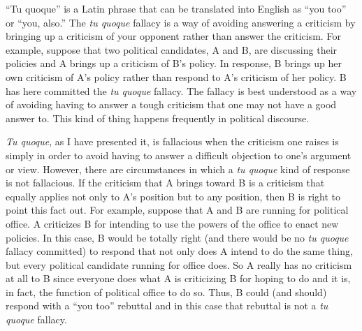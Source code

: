 ``Tu quoque'' is a Latin phrase that can be translated into English as ``you too'' or ``you, also.'' The \textit{tu quoque} fallacy is a way of avoiding answering a criticism by bringing up a criticism of your opponent rather than answer the criticism. For example, suppose that two political candidates, A and B, are discussing their policies and A brings up a criticism of B's policy. In response, B brings up her own criticism of A's policy rather than respond to A's criticism of her policy. B has here committed the \textit{tu quoque} fallacy. The fallacy is best understood as a way of avoiding having to answer a tough criticism that one may not have a good answer to. This kind of thing happens frequently in political discourse.

\textit{Tu quoque}, as I have presented it, is fallacious when the criticism one raises is simply in order to avoid having to answer a difficult objection to one's argument or view. However, there are circumstances in which a \textit{tu quoque} kind of response is not fallacious. If the criticism that A brings toward B is a criticism that equally applies not only to A's position but to any position, then B is right to point this fact out. For example, suppose that A and B are running for political office. A criticizes B for intending to use the powers of the office to enact new policies. In this case, B would be totally right (and there would be no \textit{tu quoque} fallacy committed) to respond that not only does A intend to do the same thing, but every political candidate running for office does. So A really has no criticism at all to B since everyone does what A is criticizing B for hoping to do and it is, in fact, the function of political office to do so. Thus, B could (and should) respond with a ``you too'' rebuttal and in this case that rebuttal is not a \textit{tu quoque} fallacy.

